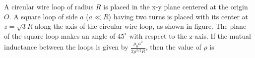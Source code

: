 
\item A circular wire loop of radius \( R \) is placed in the x-y plane centered at the origin \( O \). A square loop of side \( a \) (\( a \ll R \)) having two turns is placed with its center at \( z = \sqrt{3} R \) along the axis of the circular wire loop, as shown in figure. The plane of the square loop makes an angle of \( 45^\circ \) with respect to the z-axis. If the mutual inductance between the loops is given by \( \frac{\mu_0 a^2}{2 \rho^{3/2} R} \), then the value of \( \rho \) is
    \begin{center}
    \end{center}
